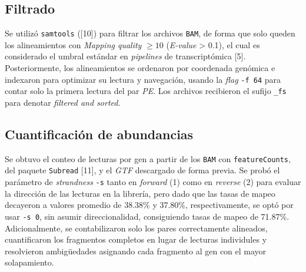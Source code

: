 \documentclass[
  12pt,
  letterpaper,
  DIV=11,
  numbers=noendperiod]{scrartcl}
\begin{document}
\subsection{Filtrado}\label{filtrado}

Se utilizó \texttt{samtools} ({[}10{]}) para filtrar los archivos
\texttt{BAM}, de forma que solo queden los alineamientos con
\emph{Mapping quality} \(\geq 10\) (\emph{E-value} \textgreater{} 0.1),
el cual es considerado el umbral estándar en \emph{pipelines} de
transcriptómica {[}5{]}. Posteriormente, los alineamientos se ordenaron
por coordenada genómica e indexaron para optimizar su lectura y
navegación, usando la \emph{flag} \texttt{-f\ 64} para contar solo la
primera lectura del par \emph{PE}. Los archivos recibieron el sufijo
\texttt{\_fs} para denotar \emph{filtered and sorted}.

\subsection{Cuantificación de
abundancias}\label{cuantificaciuxf3n-de-abundancias}

Se obtuvo el conteo de lecturas por gen a partir de los \texttt{BAM} con
\texttt{featureCounts}, del paquete \texttt{Subread} {[}11{]}, y el
\emph{GTF} descargado de forma previa. Se probó el parámetro de
\emph{strandness} \texttt{-s} tanto en \emph{forward} (1) como en
\emph{reverse} (2) para evaluar la dirección de las lecturas en la
librería, pero dado que las tasas de mapeo decayeron a valores promedio
de 38.38\% y 37.80\%, respectivamente, se optó por usar \texttt{-s\ 0},
sin asumir direccionalidad, consiguiendo tasas de mapeo de 71.87\%.
Adicionalmente, se contabilizaron solo los pares correctamente
alineados, cuantificaron los fragmentos completos en lugar de lecturas
individules y resolvieron ambigüedades asignando cada fragmento al gen
con el mayor solapamiento.
\end{document}
